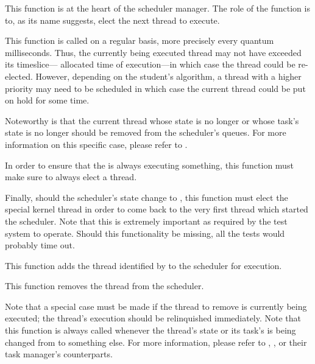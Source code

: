          {
           This function is at the heart of the scheduler manager. The role
           of the  function is to, as its name
           suggests, elect the next thread to execute.

           \-

           This function is called on a regular basis, more precisely
           every quantum milliseconds. Thus, the currently being executed
           thread may not have exceeded its timeslice---\ie{} allocated time
           of execution---in which case the thread could be re-elected.
           However, depending on the student's algorithm, a thread with a
           higher priority may need to be scheduled in which case the current
           thread could be put on hold for some time.

           \-

           Noteworthy is that the current thread whose state is no longer
            or whose task's state is no longer
            should be removed from the scheduler's queues.
           For more information on this specific case, please refer to
           .

           \-

           In order to ensure that the  is always executing
           something, this function must make sure to always elect a thread.

           \-

           Finally, should the scheduler's state change to
           , this function must elect the special
           kernel thread \ie{}  in order to come back
           to the very first thread which started the scheduler. Note that
           this is extremely important as required by the test system to
           operate. Should this functionality be missing, all the tests
           would probably time out.
         }

         {
           This function adds the thread identified by  to
           the scheduler for execution.
         }

         {
           This function removes the thread  from the scheduler.

           \-

           Note that a special case must be made if the thread to remove
           is currently being executed; the thread's execution should be
           relinquished immediately. Note that this function is always
           called whenever the thread's state or its task's is being changed
           from  to something else. For more information, please
           refer to , ,
            or their task manager's counterparts.
         }


